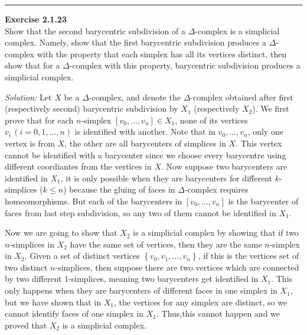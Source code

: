 \documentclass[a4paper, 12pt]{article}
\newenvironment{problem}[2][Exercise]
    { \begin{mdframed}[backgroundcolor=gray!20] \textbf{#1 #2} \\}
    {  \end{mdframed}}
\newenvironment{solution}
    {\textit{Solution:}}
    {}
\begin{document}
\noindent\rule{7in}{2.8pt}

\begin{problem}{2.1.23}
Show that the second barycentric subdivision of a \(\Delta\)-complex is a simplicial complex. Namely, show that the first barycentric subdivision produces a \(\Delta\)-complex 
with the property that each simplex has all its vertices distinct, then show that for a \(\Delta\)-complex with this property, barycentric subdivision produces a simplicial complex.
\end{problem}
\begin{solution}
Let \(X\) be a \(\Delta\)-complex, and denote the \(\Delta\)-complex obtained after first (respectively second)	barycentric subdivision by \(X_1\) (respectively \(X_2\)). 
We first prove that for each \(n\)-simplex \([v_0,\ldots,v_n]\in X_1\), none of its vertices \(v_i\,(i=0,1,\ldots,n)\) is identified with another. Note that in \(v_0,\ldots,v_n\), only one vertex is from \(X\), the other are all barycenters of 
simplices in \(X\). This vertex cannot be identified with a barycenter since we choose every barycentre using different coordiantes from the vertices in \(X\). Now suppose two barycenters are identified in \(X_1\), it is only possible when they are barycenters 
for different \(k\)-simplices (\(k\leq n\)) because the gluing of faces in \(\Delta\)-complex requires homeomorphisms. But each of the barycenters in \([v_0,\ldots,v_n]\) is the barycenter of faces from last step subdivision, so any two of them cannot be identified in \(X_1\). 
\par 
Now we are going to show that \(X_2\) is a simplicial complex by showing that if two \(n\)-simplices in \(X_2\) have the same set of vertices, then they are the same \(n\)-simplex in \(X_2\). Given a set of distinct vertices \(\left\{ v_0,v_1,\ldots,v_n \right\}\), 
if this is the vertices set of two distinct \(n\)-simplices, then suppose there are two vertices which are connected by two different \(1\)-simplices, meaning two barycenters get identified in \(X_1\). This only happens when they are barycenters of different faces in one simplex in \(X_1\), but 
we have shown that in \(X_1\), the vertices for any simplex are distinct, so we cannot identify faces of one simplex in \(X_1\). Thus,this cannot happen and we proved that \(X_2\) is a simplicial complex.
\end{solution}
\end{document}
